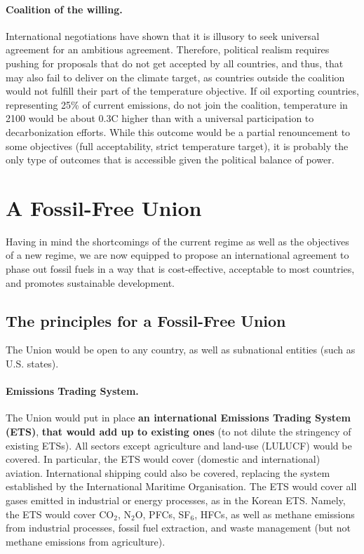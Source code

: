 \documentclass[12pt,english]{article}
\begin{document}
\paragraph{Coalition of the willing.} International negotiations have shown that it is illusory to seek universal agreement for an ambitious agreement. Therefore, political realism requires pushing for proposals that do not get accepted by all countries, and thus, that may also fail to deliver on the climate target, as countries outside the coalition would not fulfill their part of the temperature objective. If oil exporting countries, representing 25\% of current emissions, do not join the coalition, temperature in 2100 would be about 0.3\textdegree{}C higher than with a universal participation to decarbonization efforts. While this outcome would be a partial renouncement to some objectives (full acceptability, strict temperature target), %
it is probably the only type of outcomes that is accessible given the political balance of power.


\clearpage
\section{A Fossil-Free Union\label{sec:ffu}}

Having in mind the shortcomings of the current regime as well as the objectives of a new regime, we are now equipped to propose an international agreement to phase out fossil fuels in a way that is cost-effective, acceptable %
to most countries, and promotes sustainable development. 

\subsection{The principles for a Fossil-Free Union\label{subsec:principles}}

The Union would be open to any country, as well as subnational entities (such as U.S. states). 

\paragraph{Emissions Trading System.}
The Union would put in place \textbf{an international Emissions Trading System (ETS)}, \textbf{that would add up to existing ones} (to not dilute the stringency of existing ETSs). All sectors except agriculture and land-use (LULUCF) would be covered. In particular, the ETS would cover (domestic and international) aviation. International shipping could also be covered, replacing the system established by the International Maritime Organisation. The ETS would cover all gases emitted in industrial or energy processes, as in the Korean ETS. Namely, the ETS would cover CO$_\text{2}$, N$_\text{2}$O, PFCs, SF$_\text{6}$, HFCs, as well as methane emissions from industrial processes, fossil fuel extraction, and waste management (but not methane emissions from agriculture). %
\end{document}
